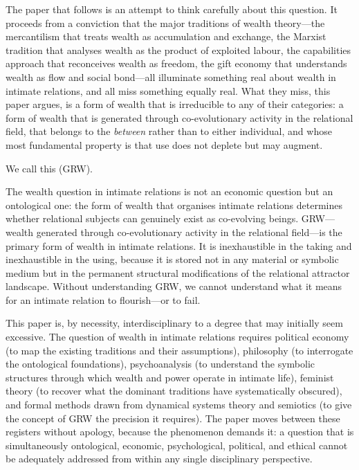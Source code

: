 The paper that follows is an attempt to think carefully about this question. It proceeds from a conviction that the major traditions of wealth theory---the mercantilism that treats wealth as accumulation and exchange, the Marxist tradition that analyses wealth as the product of exploited labour, the capabilities approach that reconceives wealth as freedom, the gift economy that understands wealth as flow and social bond---all illuminate something real about wealth in intimate relations, and all miss something equally real. What they miss, this paper argues, is a form of wealth that is irreducible to any of their categories: a form of wealth that is generated through co-evolutionary activity in the relational field, that belongs to the \emph{between} rather than to either individual, and whose most fundamental property is that use does not deplete but may augment.

We call this  (GRW).

\begin{claim}
The wealth question in intimate relations is not an economic question but an ontological one: the form of wealth that organises intimate relations determines whether relational subjects can genuinely exist as co-evolving beings. GRW---wealth generated through co-evolutionary activity in the relational field---is the primary form of wealth in intimate relations. It is inexhaustible in the taking and inexhaustible in the using, because it is stored not in any material or symbolic medium but in the permanent structural modifications of the relational attractor landscape. Without understanding GRW, we cannot understand what it means for an intimate relation to flourish---or to fail.
\end{claim}

 This paper is, by necessity, interdisciplinary to a degree that may initially seem excessive. The question of wealth in intimate relations requires political economy (to map the existing traditions and their assumptions), philosophy (to interrogate the ontological foundations), psychoanalysis (to understand the symbolic structures through which wealth and power operate in intimate life), feminist theory (to recover what the dominant traditions have systematically obscured), and formal methods drawn from dynamical systems theory and semiotics (to give the concept of GRW the precision it requires). The paper moves between these registers without apology, because the phenomenon demands it: a question that is simultaneously ontological, economic, psychological, political, and ethical cannot be adequately addressed from within any single disciplinary perspective.

